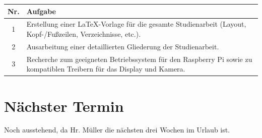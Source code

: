 \begin{table}[H]
    \centering
    \begin{tabular}{|c|p{12cm}|}
        \hline
        \textbf{Nr.} & \textbf{Aufgabe}\\
        \hline
        1 & Erstellung einer LaTeX-Vorlage für die gesamte Studienarbeit (Layout, Kopf-/Fußzeilen, Verzeichnisse, etc.).\\
        \hline
        2 & Ausarbeitung einer detaillierten Gliederung der Studienarbeit.\\
        \hline
        3 & Recherche zum geeigneten Betriebssystem für den Raspberry Pi sowie zu kompatiblen Treibern für das Display und Kamera.\\
        \hline
    \end{tabular}
\end{table}

\section{Nächster Termin}
Noch ausstehend, da Hr. Müller die nächsten drei Wochen im Urlaub ist.